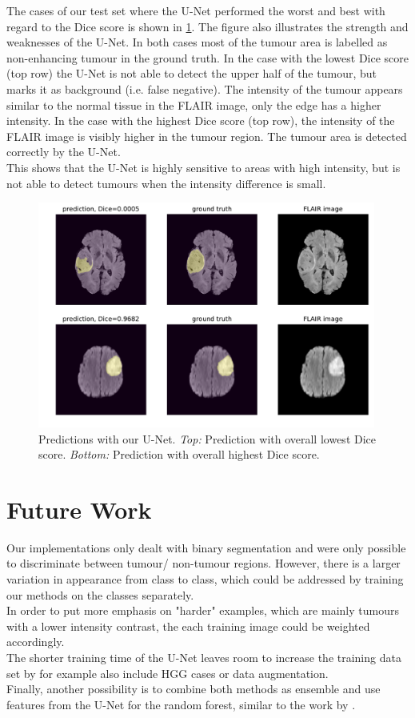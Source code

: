 \documentclass[final]{article}
\begin{document}
The cases of our test set where the U-Net performed the worst and best with regard to the Dice score is shown in \cref{fig:goodbad}. The figure also illustrates the strength and weaknesses of the U-Net. In both cases most of the tumour area is labelled as non-enhancing tumour in the ground truth. In the case with the lowest Dice score (top row) the U-Net is not able to detect the upper half of the tumour, but marks it as background (i.e. false negative). The intensity of the tumour appears similar to the normal tissue in the FLAIR image, only the edge has a higher intensity. In the case with the highest Dice score (top row), the intensity of the FLAIR image is visibly higher in the tumour region. The tumour area is detected correctly by the U-Net.\\
This shows that the U-Net is highly sensitive to areas with high intensity, but is not able to detect tumours when the intensity difference is small.

\begin{figure}[h]
\centering
\includegraphics[width=0.99\textwidth]{goodbad_ex}
\caption{Predictions with our U-Net. \textit{Top:} Prediction with overall lowest Dice score. \textit{Bottom:} Prediction with overall highest Dice score.}
\label{fig:goodbad}
\end{figure}
\newpage
\section{Future Work}
Our implementations only dealt with binary segmentation and were only possible to discriminate between tumour/ non-tumour regions. However, there is a larger variation in appearance from class to class, which could be addressed by training our methods on the classes separately.\\ In order to put more emphasis on "harder" examples, which are mainly tumours with a lower intensity contrast, the each training image could be weighted accordingly. \\
The shorter training time of the U-Net leaves room to increase the training data set by for example also include HGG cases or data augmentation. \\
Finally, another possibility is to combine both methods as ensemble and use features from the U-Net for the random forest, similar to the work by \citeauthor{brats2017short}.
\end{document}
